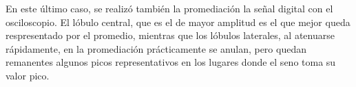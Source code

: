 \documentclass[assd_tp3_main.tex]{subfiles}
\begin{document}
En este último caso, se realizó también la promediación la señal digital con el osciloscopio. El lóbulo central, que es el de mayor amplitud es el que mejor queda respresentado por el promedio, mientras que los lóbulos laterales, al atenuarse rápidamente, en la promediación prácticamente se anulan, pero quedan remanentes algunos picos representativos en los lugares donde el seno toma su valor pico.
\end{document}
